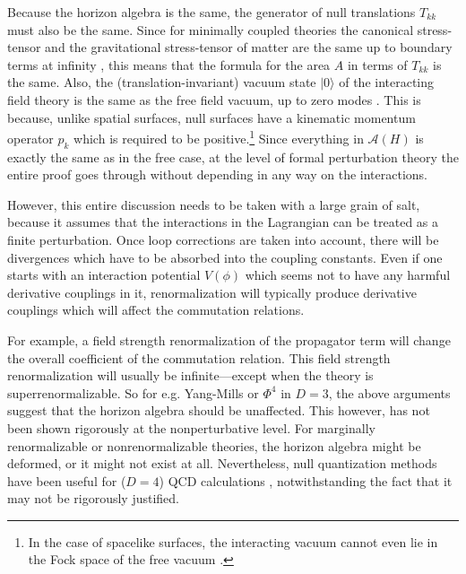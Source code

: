 \documentclass{article}
\begin{document}
Because the horizon algebra is the same, the generator of null translations $T_{kk}$ must also be the same.  Since for minimally coupled theories the canonical stress-tensor and the gravitational stress-tensor of matter are the same up to boundary terms at infinity \cite{fursaev99}, this means that the formula for the area $A$ in terms of $T_{kk}$ is the same.  Also, the (translation-invariant) vacuum state $|0\rangle$ of the interacting field theory is the same as the free field vacuum, up to zero modes \cite{burkardt96}.  This is because, unlike spatial surfaces, null surfaces have a kinematic momentum operator $p_k$ which is required to be positive.\footnote{In the case of spacelike surfaces, the interacting vacuum cannot even lie in the Fock space of the free vacuum \cite{EF05}.}  Since everything in $\mathcal{A}(H)$ is exactly the same as in the free case, at the level of formal perturbation theory the entire proof goes through without depending in any way on the interactions.

However, this entire discussion needs to be taken with a large grain of salt, because it assumes that the interactions in the Lagrangian can be treated as a finite perturbation.  Once loop corrections are taken into account, there will be divergences which have to be absorbed into the coupling constants.  Even if one starts with an interaction potential $V(\phi)$ which seems not to have any harmful derivative couplings in it, renormalization will typically produce derivative couplings which will affect the commutation relations.

For example, a field strength renormalization of the propagator term will change the overall coefficient of the commutation relation.  This field strength renormalization will usually be infinite---except when the theory is superrenormalizable.  So for e.g. Yang-Mills or $\Phi^4$ in $D = 3$, the above arguments suggest that the horizon algebra should be unaffected.  This however, has not been shown rigorously at the nonperturbative level.  For marginally renormalizable or nonrenormalizable theories, the horizon algebra might be deformed, or it might not exist at all.  Nevertheless, null quantization methods have been useful for ($D=4$) QCD calculations \cite{burkardt96},  notwithstanding the fact that it may not be rigorously justified.
\end{document}
